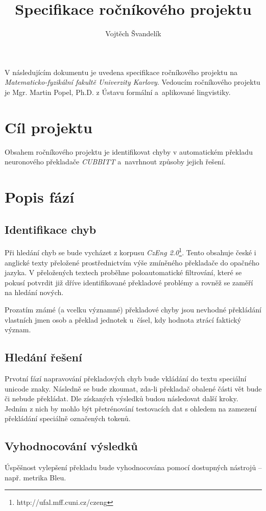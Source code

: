 \documentclass[12pt,a4paper]{article}
\title{Specifikace ročníkového projektu}
\author{Vojtěch Švandelík}
\begin{document}
	\maketitle
	
	V následujícím dokumentu je uvedena specifikace ročníkového projektu na \textit{Matematicko-fyzikální fakultě Univerzity Karlovy}. Vedoucím ročníkového projektu je Mgr. Martin Popel, Ph.D. z Ústavu formální a~aplikované lingvistiky.
	
	\section{Cíl projektu}
	Obsahem ročníkového projektu je identifikovat chyby v automatickém překladu neuronového překladače \textit{CUBBITT} a~navrhnout způsoby jejich řešení.
	
	\section{Popis fází}
	\subsection{Identifikace chyb}
	Při hledání chyb se bude vycházet z korpusu \textit{CzEng 2.0}\footnote{http://ufal.mff.cuni.cz/czeng}. Tento obsahuje české i anglické texty přeložené prostřednictvím výše zmíněného překladače do opačného jazyka. V přeložených textech proběhne poloautomatické filtrování, které se pokusí potvrdit již dříve identifikované překladové problémy a rovněž se zaměří na hledání nových.
	
	Prozatím známé (a vcelku významné) překladové chyby jsou nevhodné překládání vlastních jmen osob a překlad jednotek u~čísel, kdy hodnota ztrácí faktický význam.
	
	\subsection{Hledání řešení}
	Prvotní fází napravování překladových chyb bude vkládání do textu speciální unicode znaky. Následně se bude zkoumat, zda-li překladač obalené části vět bude či nebude překládat. Dle získaných výsledků budou následovat další kroky. Jedním z nich by mohlo být přetrénování testovacích dat s ohledem na zamezení překládání speciálně označených tokenů.
	
	\subsection{Vyhodnocování výsledků}
	Úspěšnost vylepšení překladu bude vyhodnocována pomocí dostupných nástrojů -- např. metrika Bleu.
	
\end{document}
